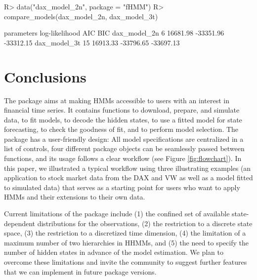 \documentclass[article,shortnames]{jss}
\begin{document}
%
\begin{Schunk}
\begin{Sinput}
R> data("dax_model_2n", package = "fHMM")
R> compare_models(dax_model_2n, dax_model_3t)
\end{Sinput}
\begin{Soutput}
             parameters log-likelihood       AIC       BIC
dax_model_2n          6       16681.98 -33351.96 -33312.15
dax_model_3t         15       16913.33 -33796.65 -33697.13
\end{Soutput}
\end{Schunk}
%


\section{Conclusions} \label{sec:conclusion} %

The  package aims at making HMMs accessible to  users with an interest in financial time series. It contains functions to download, prepare, and simulate data, to fit models, to decode the hidden states, to use a fitted model for state forecasting, to check the goodness of fit, and to perform model selection. The  package has a user-friendly design: All model specifications are centralized in a list of controls, four different package objects can be seamlessly passed between functions, and its usage follows a clear workflow (see Figure \ref{fig:flowchart}). In this paper, we illustrated a typical workflow using three illustrating examples (an application to stock market data from the DAX and VW as well as a model fitted to simulated data) that serves as a starting point for  users who want to apply HMMs and their extensions to their own data.

Current limitations of the  package include (1) the confined set of available state-dependent distributions for the observations, (2) the restriction to a discrete state space, (3) the restriction to a discretized time dimension, (4) the limitation of a maximum number of two hierarchies in HHMMs, and (5) the need to specify the number of hidden states in advance of the model estimation. We plan to overcome these limitations and invite the community to suggest further features that we can implement in future package versions.

\end{document}
